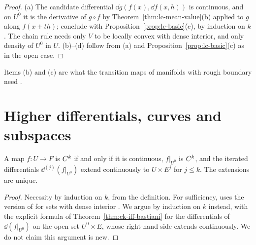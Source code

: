 \begin{proof}
  \leanok
  (a) The candidate differential $\dd g(f(x), \dd f(x, h))$ is continuous, and on $U^0$ it is the
  derivative of $g \circ f$ by Theorem~\ref{thm:lc-mean-value}(b) applied to $g$ along
  $f(x + th)$; conclude with Proposition~\ref{prop:lc-basic}(c), by induction on $k$. The chain
  rule needs only $V$ to be locally convex with dense interior, and only density of $U^0$ in $U$.
  (b)--(d) follow from (a) and Proposition~\ref{prop:lc-basic}(c) as in the open case.
\end{proof}

Items (b) and (c) are what the transition maps of manifolds with rough boundary need
\cite[Remark~3.5.2]{GN26}.

\section{Higher differentials, curves and subspaces}

\begin{theorem}
  \label{thm:lc-higher}
  \leanok
  A map $f \colon U \to F$ is $C^{k}$ if and only if it is continuous, $f|_{U^0}$ is $C^{k}$,
  and the iterated differentials $\dd^{(j)}(f|_{U^0})$ extend continuously to
  $U \times E^j$ for $j \le k$. The extensions are unique.
\end{theorem}

\begin{proof}
  \leanok
  Necessity by induction on $k$, from the definition. For sufficiency, \cite{GN26} uses the
  version of \cite[Lemma~1.3.12]{GN26} for sets with dense interior
  \cite[Remark~1.4.12]{GN26}. We argue by induction on $k$ instead, with the explicit formula of
  Theorem~\ref{thm:ck-iff-bastiani} for the differentials of $\dd(f|_{U^0})$ on the open set
  $U^0 \times E$, whose right-hand side extends continuously. We do not claim this argument is
  new.
\end{proof}

